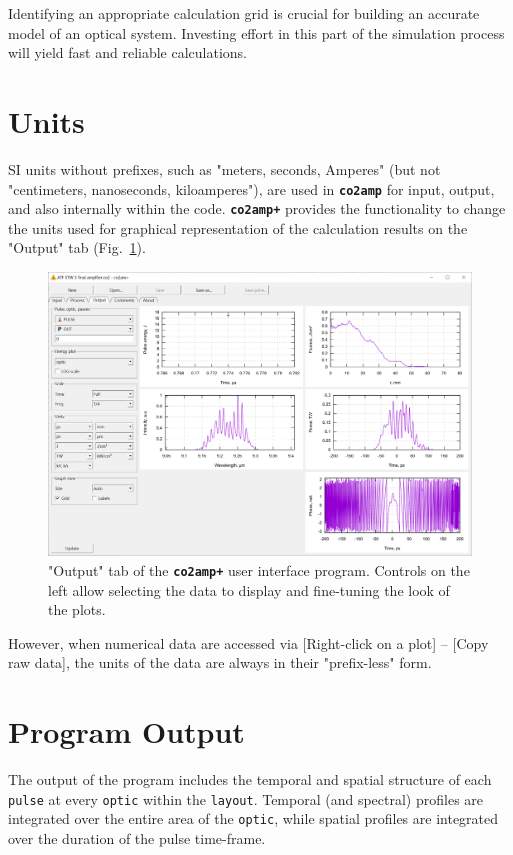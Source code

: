 \documentclass{report}
\begin{document}
Identifying an appropriate calculation grid is crucial for building an accurate model of an optical system. Investing effort in this part of the simulation process will yield fast and reliable calculations.


\section{Units}
SI units without prefixes, such as "meters, seconds, Amperes" (but not "centimeters, nanoseconds, kiloamperes"), are used in \textbf{\texttt{co2amp}} for input, output, and also internally within the code. \textbf{\texttt{co2amp+}} provides the functionality to change the units used for graphical representation of the calculation results on the "Output" tab (Fig.~\ref{fig:gui-output}).
\begin{figure}[ht]
 \centering
 \includegraphics[width=14cm]{images/gui-output}
 \caption{"Output" tab of the \textbf{\texttt{co2amp+}} user interface program. Controls on the left allow selecting the data to display and fine-tuning the look of the plots.}
 \label{fig:gui-output}
\end{figure}
However, when numerical data are accessed via [Right-click on a plot] -- [Copy raw data], the units of the data are always in their "prefix-less" form.


\section{Program Output}
The output of the program includes the temporal and spatial structure of each \texttt{pulse} at every \texttt{optic} within the \texttt{layout}. Temporal (and spectral) profiles are integrated over the entire area of the \texttt{optic}, while spatial profiles are integrated over the duration of the pulse time-frame.
\end{document}
